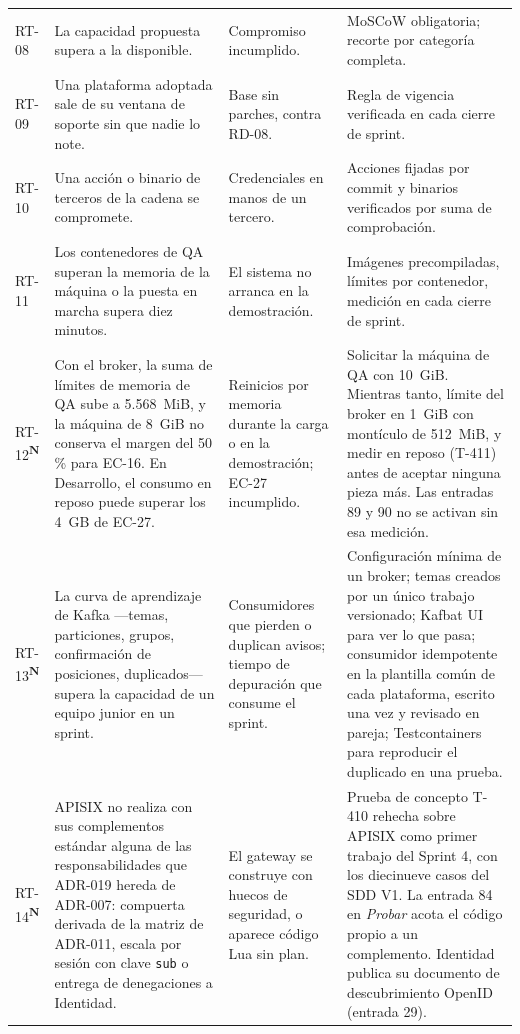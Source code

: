 \documentclass[11pt,a4paper]{article}
\newcommand{\nueva}{\textsuperscript{\textcolor{vinotinto}{\scriptsize\bfseries N}}}
\begin{document}
\begin{longtable}{L{1.1cm} L{4.0cm} L{3.5cm} L{5.0cm}}
RT-08 & La capacidad propuesta supera a la disponible. & Compromiso incumplido. & MoSCoW obligatoria; recorte por categoría completa. \\
RT-09 & Una plataforma adoptada sale de su ventana de soporte sin que nadie lo note. & Base sin parches, contra RD-08. & Regla de vigencia verificada en cada cierre de sprint. \\
RT-10 & Una acción o binario de terceros de la cadena se compromete. & Credenciales en manos de un tercero. & Acciones fijadas por commit y binarios verificados por suma de comprobación. \\
RT-11 & Los contenedores de QA superan la memoria de la máquina o la puesta en marcha supera diez minutos. & El sistema no arranca en la demostración. & Imágenes precompiladas, límites por contenedor, medición en cada cierre de sprint. \\
RT-12\nueva & Con el broker, la suma de límites de memoria de QA sube a 5.568~MiB, y la máquina de 8~GiB no conserva el margen del 50\,\% para EC-16. En Desarrollo, el consumo en reposo puede superar los 4~GB de EC-27. & Reinicios por memoria durante la carga o en la demostración; EC-27 incumplido. & Solicitar la máquina de QA con 10~GiB. Mientras tanto, límite del broker en 1~GiB con montículo de 512~MiB, y medir en reposo (T-411) antes de aceptar ninguna pieza más. Las entradas 89 y 90 no se activan sin esa medición. \\
RT-13\nueva & La curva de aprendizaje de Kafka ---temas, particiones, grupos, confirmación de posiciones, duplicados--- supera la capacidad de un equipo junior en un sprint. & Consumidores que pierden o duplican avisos; tiempo de depuración que consume el sprint. & Configuración mínima de un broker; temas creados por un único trabajo versionado; Kafbat UI para ver lo que pasa; consumidor idempotente en la plantilla común de cada plataforma, escrito una vez y revisado en pareja; Testcontainers para reproducir el duplicado en una prueba. \\
RT-14\nueva & APISIX no realiza con sus complementos estándar alguna de las responsabilidades que ADR-019 hereda de ADR-007: compuerta derivada de la matriz de ADR-011, escala por sesión con clave \texttt{sub} o entrega de denegaciones a Identidad. & El gateway se construye con huecos de seguridad, o aparece código Lua sin plan. & Prueba de concepto T-410 rehecha sobre APISIX como primer trabajo del Sprint 4, con los diecinueve casos del SDD V1. La entrada 84 en \emph{Probar} acota el código propio a un complemento. Identidad publica su documento de descubrimiento OpenID (entrada 29). \\

\end{longtable}
\end{document}
